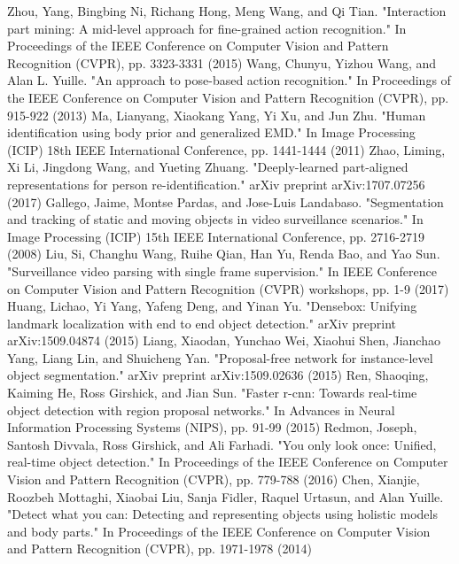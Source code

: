 \begin{thebibliography}{}
Zhou, Yang, Bingbing Ni, Richang Hong, Meng Wang, and Qi Tian. "Interaction part mining: A mid-level approach for fine-grained action recognition." In Proceedings of the IEEE Conference on Computer Vision and Pattern Recognition (CVPR), pp. 3323-3331 (2015)
Wang, Chunyu, Yizhou Wang, and Alan L. Yuille. "An approach to pose-based action recognition." In Proceedings of the IEEE Conference on Computer Vision and Pattern Recognition (CVPR), pp. 915-922 (2013)
%
Ma, Lianyang, Xiaokang Yang, Yi Xu, and Jun Zhu. "Human identification using body prior and generalized EMD." In Image Processing (ICIP) 18th IEEE International Conference, pp. 1441-1444 (2011)
Zhao, Liming, Xi Li, Jingdong Wang, and Yueting Zhuang. "Deeply-learned part-aligned representations for person re-identification." arXiv preprint arXiv:1707.07256 (2017)
%
Gallego, Jaime, Montse Pardas, and Jose-Luis Landabaso. "Segmentation and tracking of static and moving objects in video surveillance scenarios." In Image Processing (ICIP) 15th IEEE International Conference, pp. 2716-2719 (2008)
Liu, Si, Changhu Wang, Ruihe Qian, Han Yu, Renda Bao, and Yao Sun. "Surveillance video parsing with single frame supervision." In IEEE Conference on Computer Vision and Pattern Recognition (CVPR) workshops, pp. 1-9 (2017)
% 
Huang, Lichao, Yi Yang, Yafeng Deng, and Yinan Yu. "Densebox: Unifying landmark localization with end to end object detection." arXiv preprint arXiv:1509.04874 (2015)
Liang, Xiaodan, Yunchao Wei, Xiaohui Shen, Jianchao Yang, Liang Lin, and Shuicheng Yan. "Proposal-free network for instance-level object segmentation." arXiv preprint arXiv:1509.02636 (2015)
Ren, Shaoqing, Kaiming He, Ross Girshick, and Jian Sun. "Faster r-cnn: Towards real-time object detection with region proposal networks." In Advances in Neural Information Processing Systems (NIPS), pp. 91-99 (2015)
Redmon, Joseph, Santosh Divvala, Ross Girshick, and Ali Farhadi. "You only look once: Unified, real-time object detection." In Proceedings of the IEEE Conference on Computer Vision and Pattern Recognition (CVPR), pp. 779-788 (2016)
%
Chen, Xianjie, Roozbeh Mottaghi, Xiaobai Liu, Sanja Fidler, Raquel Urtasun, and Alan Yuille. "Detect what you can: Detecting and representing objects using holistic models and body parts." In Proceedings of the IEEE Conference on Computer Vision and Pattern Recognition (CVPR), pp. 1971-1978 (2014)

\end{thebibliography}
